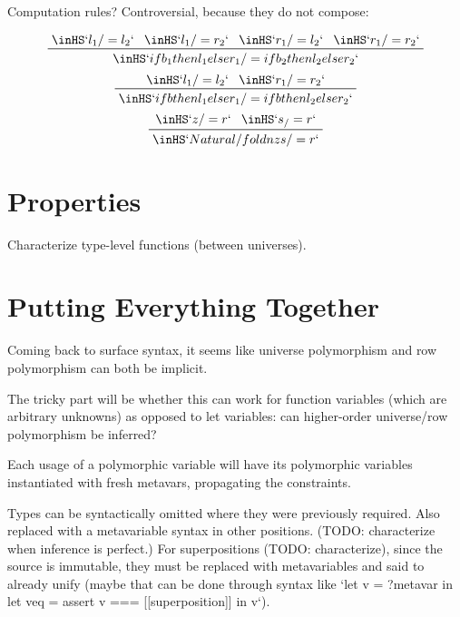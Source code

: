 \documentclass[11pt, twoside, reqno]{book}
\begin{document}
Computation rules?
Controversial, because they do not compose:

\begin{displaymath}
\prftree{\inHS`l_1 /= l_2`}{\inHS`l_1 /= r_2`}{\inHS`r_1 /= l_2`}{\inHS`r_1 /= r_2`}{\inHS`if b_1 then l_1 else r_1 /= if b_2 then l_2 else r_2`}
\end{displaymath}
\begin{displaymath}
\prftree{\inHS`l_1 /= l_2`}{\inHS`r_1 /= r_2`}{\inHS`if b then l_1 else r_1 /= if b then l_2 else r_2`}
\end{displaymath}
\begin{displaymath}
\prftree{\inHS`z /= r`}{\inHS`s _ /= r`}{\inHS`Natural/fold n z s /= r`}
\end{displaymath}



\chapter{Properties}

Characterize type-level functions (between universes).



\chapter{Putting Everything Together}
Coming back to surface syntax, it seems like universe polymorphism and row polymorphism can both be implicit.

The tricky part will be whether this can work for function variables (which are arbitrary unknowns) as opposed to let variables: can higher-order universe/row polymorphism be inferred?

Each usage of a polymorphic variable will have its polymorphic variables instantiated with fresh metavars, propagating the constraints.

Types can be syntactically omitted where they were previously required.
Also replaced with a metavariable syntax in other positions.
(TODO: characterize when inference is perfect.)
For superpositions (TODO: characterize), since the source is immutable, they must be replaced with metavariables and said to already unify (maybe that can be done through syntax like \inHS`let v = ?metavar in let veq = assert v === [[superposition]] in v`).


\iffalse
\begin{appdices}
\end{appdices}


\begin{bibliog}
\end{bibliog}
\fi
\end{document}
